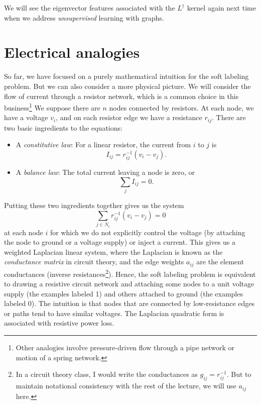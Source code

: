 \documentclass[12pt, leqno]{article} %
\begin{document}
We will see the eigenvector features associated with the $L^\dagger$
kernel again next time when we address {\em unsupervised} learning
with graphs.

\section{Electrical analogies}


So far, we have focused on a purely mathematical intuition for the
soft labeling problem.  But we can also consider a more physical
picture.  We will consider the flow of current through a resistor
network, which is a common choice in this business\footnote{%
  Other analogies involve pressure-driven flow through a pipe network
  or motion of a spring network.}
We suppose there are $n$ nodes connected by resistors.  At each node,
we have a voltage $v_i$, and on each resistor edge we have a
resistance $r_{ij}$.  There are two basic ingredients to the equations:
\begin{itemize}
\item A {\em constitutive law}: For a linear resistor,
  the current from $i$ to $j$ is
  \[
    I_{ij} = r_{ij}^{-1} (v_i-v_j).
  \]
\item A {\em balance law}: The total current leaving a node is zero, or
  \[
    \sum_{j} I_{ij} = 0.
  \]
\end{itemize}
Putting these two ingredients together gives us the system
\[
  \sum_{j \in N_i} r_{ij}^{-1} (v_i-v_j) = 0
\]
at each node $i$ for which we do not explicitly control the voltage
(by attaching the node to ground or a voltage supply) or inject a
current.  This gives us a weighted Laplacian linear system,
where the Laplacian is known as the {\em conductance matrix} in
circuit theory, and the edge weights $a_{ij}$ are the
element conductances (inverse resistances\footnote{%
  In a circuit theory class, I would write the conductances as $g_{ij}
  = r_{ij}^{-1}$.  But to maintain notational consistency with the
  rest of the lecture, we will use $a_{ij}$ here.
}).
Hence, the soft labeling problem is equivalent to drawing a resistive
circuit network and attaching some nodes to a unit voltage supply (the
examples labeled 1) and others attached to ground (the examples
labeled 0).  The intuition is that nodes that are connected by
low-resistance edges or paths tend to have similar voltages.  The
Laplacian quadratic form is associated with resistive power loss.
\end{document}
